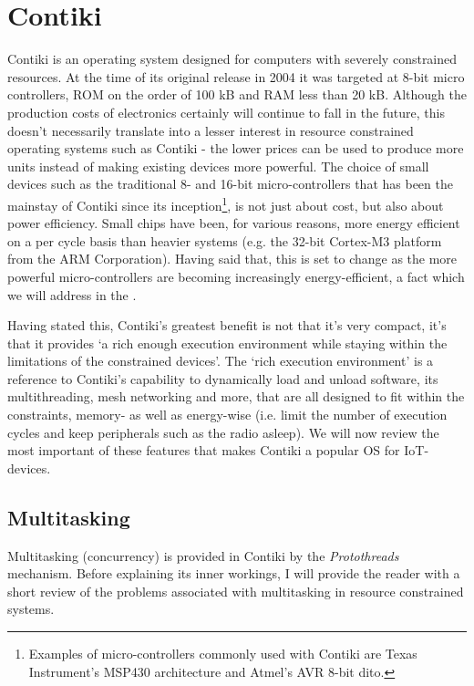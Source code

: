 \documentclass[final,a4paper,twoside,11pt,onecolumn]{report}
\begin{document}
\section{Contiki}
Contiki is an operating system designed for computers with severely constrained resources\cite{dunkels04contiki}. At the time of its original release in 2004 it was targeted at 8-bit micro controllers, ROM on the order of 100 kB and RAM less than 20 kB\citep[1]{dunkels04contiki}. Although the production costs of electronics certainly will continue to fall in the future, this doesn't necessarily translate into a lesser interest in resource constrained operating systems such as Contiki - the lower prices can be used to produce more units instead of making existing devices more powerful. The choice of small devices such as the traditional 8- and 16-bit micro-controllers that has been the mainstay of Contiki since its inception\footnote{Examples of micro-controllers commonly used with Contiki are Texas Instrument's MSP430 architecture and Atmel's AVR 8-bit dito.}, is not just about cost, but also about power efficiency. Small chips have been, for various reasons, more energy efficient on a per cycle basis than heavier systems (e.g. the 32-bit  Cortex-M3 platform from the ARM Corporation). Having said that, this is set to change as the more powerful micro-controllers are becoming increasingly energy-efficient, a fact which we will address in the .

Having stated this, Contiki's greatest benefit is not that it's very compact, it's that it provides `a rich enough execution environment while staying within the limitations of the constrained devices'\citep[Introduction]{dunkels04contiki}. The `rich execution environment' is a reference to Contiki's capability to dynamically load and unload software, its multithreading, mesh networking\cite{tsiftes10rpl} and more, that are all designed to fit within the constraints, memory- as well as energy-wise (i.e. limit the number of execution cycles and keep peripherals such as the radio asleep). We will now review the most important of these features that makes Contiki a popular OS for IoT-devices.

\subsection{Multitasking}
Multitasking (concurrency) is provided in Contiki by the \emph{Protothreads} mechanism\cite{dunkels2005protothreads}. Before explaining its inner workings, I will provide the reader with a short review of the problems associated with multitasking in resource constrained systems.
\end{document}
